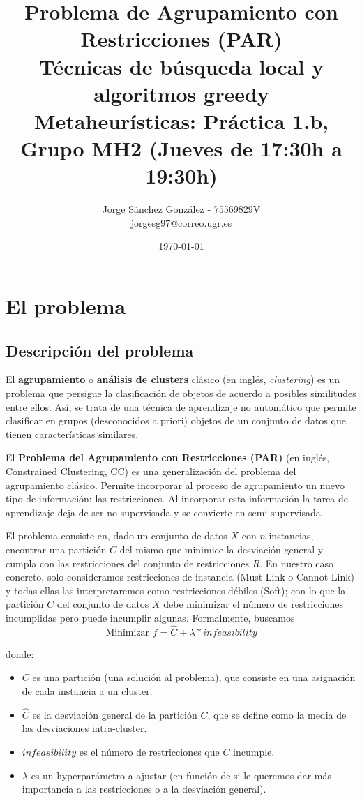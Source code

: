 \documentclass[11pt,a4paper]{article}
\title{Problema de Agrupamiento con Restricciones (PAR)
	\\\medskip \large Técnicas de búsqueda local y algoritmos greedy \\\medskip
	\large Metaheurísticas: Práctica 1.b, Grupo MH2 (Jueves de 17:30h a 19:30h)}
\author{Jorge Sánchez González - 75569829V \\ jorgesg97@correo.ugr.es}
\date{ \today }
\begin{document}
	
	
	\maketitle 
	\newpage
	\tableofcontents
	\newpage
	
	
	\section{El problema}
	
	\subsection{Descripción del problema}\label{sec:problema}
	El \textbf{agrupamiento} o \textbf{análisis de clusters} clásico (en inglés, \emph{clustering}) es un problema que persigue la clasificación de objetos de acuerdo a posibles similitudes entre ellos. Así, se trata de una técnica de aprendizaje no automático que permite clasificar en grupos (desconocidos a priori) objetos de un conjunto de datos que tienen características similares.
	
    El \textbf{Problema del Agrupamiento con Restricciones (PAR)} (en
    inglés, Constrained Clustering, CC) es una
    generalización del problema del agrupamiento clásico.
    Permite incorporar al proceso de agrupamiento un nuevo tipo
    de información: las restricciones. Al incorporar esta información la tarea de aprendizaje deja de ser no supervisada y se convierte en semi-supervisada. 
    
    El problema consiste en, dado un conjunto de datos $X$ con $n$ instancias, encontrar una partición $C$ del mismo que minimice la desviación general y cumpla con las restricciones del conjunto de restricciones $R$. En nuestro caso concreto, solo consideramos restricciones de instancia (Must-Link o Cannot-Link) y todas ellas las interpretaremos como restricciones débiles (Soft); con lo que la partición $C$ del conjunto de datos $X$ debe minimizar el número de restricciones incumplidas pero puede incumplir algunas. Formalmente, buscamos
    $$ \text{Minimizar } f = \hat{C} + \lambda * infeasibility$$
	
	donde:
	\begin{itemize}
		\item $C$ es una partición (una solución al problema), que consiste en una asignación de cada instancia a un cluster.
		\item $\hat{C}$ es la desviación general de la partición $C$, que se define como la media de las desviaciones intra-cluster.
		\item $infeasibility$ es el número de restricciones que $C$ incumple.
		\item $\lambda$ es un hyperparámetro a ajustar (en función de si le queremos dar más importancia a las restricciones o a la desviación general).
		
	\end{itemize}
\end{document}
